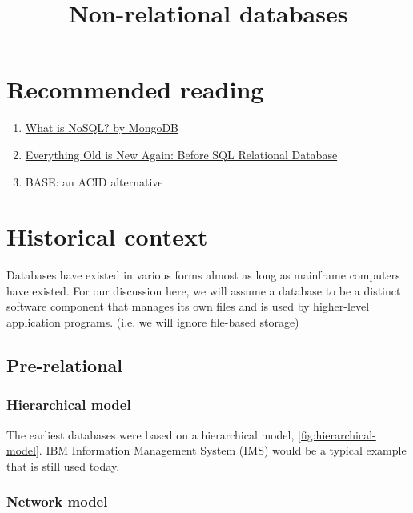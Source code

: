 \documentclass[slides]{pgnotes}
\title{Non-relational databases}
\begin{document}
\maketitle

\section*{Recommended reading}

\begin{enumerate}
\item \href{https://www.mongodb.com/nosql-explained}{What is NoSQL? by MongoDB}
\item \href{https://www.zoomdata.com/master-class/architecture-and-deployment/everything-old-new-again-sql-relational-database/}{Everything Old is New Again: Before SQL Relational Database}
\item BASE: an ACID alternative \citep{pritchett:2008:base}
\end{enumerate}

\section{Historical context}

Databases have existed in various forms almost as long as mainframe computers have existed.
For our discussion here, we will assume a database to be a distinct software component that manages its own files and is used by higher-level application programs.
(i.e. we will ignore file-based storage)

\subsection{Pre-relational}

\subsubsection{Hierarchical model}

The earliest databases were based on a hierarchical model, \autoref{fig:hierarchical-model}.
IBM Information Management System (IMS) would be a typical example that is still used today. 


\subsubsection{Network model}
\end{document}
